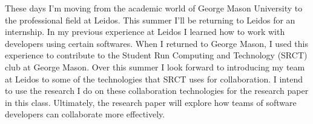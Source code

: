 \documentclass[titlepage]{article}
\begin{document}
These days I'm moving from the academic world of George Mason University to the professional field at Leidos. This summer I'll be returning to Leidos for an internship. In my previous experience at Leidos I learned how to work with developers using certain softwares. When I returned to George Mason, I used this experience to contribute to the Student Run Computing and Technology (SRCT) club at George Mason. Over this summer I look forward to introducing my team at Leidos to some of the technologies that SRCT uses for collaboration.  I intend to use the research I do on these collaboration technologies for the research paper in this class. Ultimately, the research paper will explore how teams of software developers can collaborate more effectively.








\begin{singlespace}


\nocite{*}
\end{singlespace}
\end{document}
